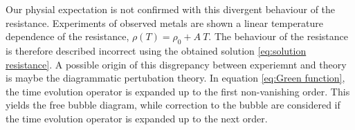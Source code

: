 Our physial expectation is not confirmed with this divergent behaviour of the resistance.
Experiments of observed metals \cite{Loehneysen} are shown a linear temperature dependence of the resistance, $\rho(T) = \rho_{0} + A\: T$.
The behaviour of the resistance is therefore described incorrect using the obtained solution \eqref{eq:solution resistance}.
A possible origin of this disgrepancy between experiemnt and theory is maybe the diagrammatic pertubation theory.
In equation \eqref{eq:Green function}, the time evolution operator is expanded up to the first non-vanishing order.
This yields the free bubble diagram, while correction to the bubble are considered if the time evolution operator is expanded up to the next order.





























